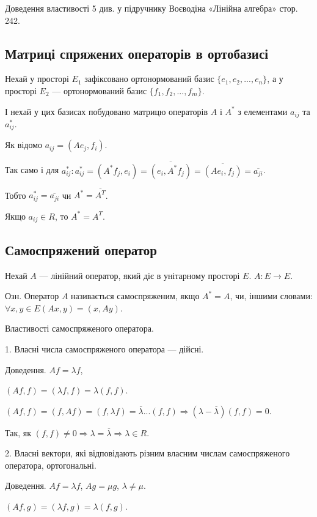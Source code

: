 Доведення властивості 5 див. у підручнику Воєводіна «Лінійна алгебра»
стор. 242.

\subsection*{Матриці спряжених операторів в ортобазисі}

Нехай у просторі $E_1$ зафіксовано ортонормований базис $\{e_1, e_2, ..., e_n\}$, а у
просторі $E_2$ --- ортонормований базис $\{f_1, f_2, ..., f_m\}$.

І нехай у цих базисах побудовано матрицю операторів $A$ і $A^*$ з елементами
$a_{ij}$ та $a^*_{ij}$.

Як відомо $a_{ij} = (Ae_j, f_i)$.

Так само і для $a_{ij}^*: a_{ij}^* = (A^* f_j, e_i) = \overline{(e_i, A^* f_j)}
= \overline{(A e_i, f_j)} = \overline{a_{ji}}$.

Тобто $a_{ij}^* = \overline{a_{ji}}$ чи $A^* = \overline{A^T}$.

Якщо $a_{ij} \in R$, то $A^* = A^T$.

\subsection*{Самоспряжений оператор}

Нехай $A$ --- лінійний оператор, який діє в унітарному просторі $E$.
$A: E \rightarrow E$.

Озн. Оператор $A$ називається самоспряженим, якщо $A^* = A$, чи, іншими
словами: $\forall x, y \in E (Ax, y) = (x, A y)$.

Властивості самоспряженого оператора.

1. Власні числа самоспряженого оператора --- дійсні.

Доведення.
$Af = \lambda f$,

$(A f, f) = (\lambda f, f) = \lambda (f, f)$.

$(A f, f) = (f, A f) = (f, \lambda f) = \overline{\lambda}...(f,f) \Rightarrow (\lambda - \overline{\lambda})(f,f) = 0$.

Так, як $(f,f) \neq 0 \Rightarrow \lambda = \overline{\lambda} \Rightarrow \lambda \in R$.

2. Власні вектори, які відповідають різним власним числам самоспряженого
оператора, ортогональні.

Доведення.
$A f = \lambda f$, $A g = \mu g$, $\lambda \neq \mu$.

$(Af, g) = (\lambda f, g) = \lambda(f,g)$.

